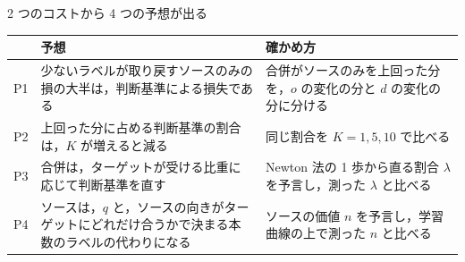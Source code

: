 \begin{frame}{2 つのコストから 4 つの予想が出る}
  \vspace{0.3em}
  \centering\footnotesize
  \renewcommand{\arraystretch}{1.35}
  \begin{tabularx}{\textwidth}{@{}l X X@{}}
    \toprule
    & 予想 & 確かめ方 \\
    \midrule
    P1 & 少ないラベルが取り戻すソースのみの損の大半は，判断基準による損失である & 合併がソースのみを上回った分を，$o$ の変化の分と $d$ の変化の分に分ける \\
    P2 & 上回った分に占める判断基準の割合は，$K$ が増えると減る & 同じ割合を $K = 1, 5, 10$ で比べる \\
    P3 & 合併は，ターゲットが受ける比重に応じて判断基準を直す & Newton 法の 1 歩から直る割合 $\lambda$ を予言し，測った $\lambda$ と比べる \\
    P4 & ソースは，$q$ と，ソースの向きがターゲットにどれだけ合うかで決まる本数のラベルの代わりになる & ソースの価値 $n$ を予言し，学習曲線の上で測った $n$ と比べる \\
    \bottomrule
  \end{tabularx}
\end{frame}

